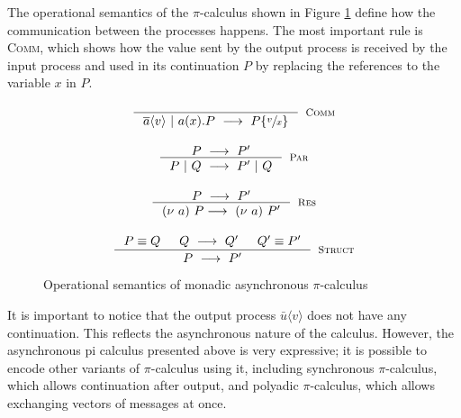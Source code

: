 \documentclass[12pt,twoside]{report}
\begin{document}
The operational semantics of the $\pi$-calculus shown in Figure \ref{picalc_op_sem} define how the communication between the processes happens. The most important rule is \textsc{Comm}, which shows how the value sent by the output process is received by the input process and used in its continuation $P$ by replacing the references to the variable $x$ in $P$.

\begin{figure}[h!]
    \centering
    \begin{equation*}
    \centering
    \begin{array}{c}
    \inference{}{\overline{a}\langle v \rangle\ |\ a(x).P\ \longrightarrow\ P\{\sfrac{v}{x}\}}[\textsc{Comm}]\\[20pt]
    \inference{P\ \longrightarrow\ P'}{P\ |\ Q\ \longrightarrow\ P'\ |\ Q}[\textsc{Par}]\\[20pt]
    \inference{P\ \longrightarrow\ P'}{(\nu\ a)\ P \longrightarrow\ (\nu\ a)\ P'}[\textsc{Res}]\\[20pt]
    \inference{
        P \equiv Q 
        & Q\ \longrightarrow\ Q' 
        & Q' \equiv P'
    }{P\ \longrightarrow\ P'}[\textsc{Struct}]
    \end{array}
    \end{equation*}
    \caption{Operational semantics of monadic asynchronous $\pi$-calculus}
    \label{picalc_op_sem}
\end{figure}{}

It is important to notice that the output process $\bar{u} \langle v \rangle$ does not have any continuation. This reflects the asynchronous nature of the calculus. However, the asynchronous pi calculus presented above is very expressive; it is possible to encode other variants of $\pi$-calculus using it, including synchronous $\pi$-calculus, which allows continuation after output, and polyadic $\pi$-calculus, which allows exchanging vectors of messages at once. 


         
\end{document}
